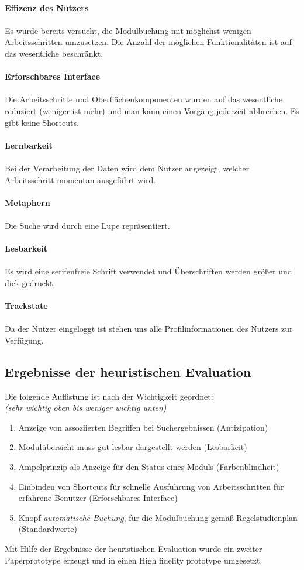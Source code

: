 \documentclass{article}
\begin{document}
\\
\textbf{Effizenz des Nutzers}\\
\\
Es wurde bereits versucht, die Modulbuchung mit möglichst wenigen Arbeitsschritten umzusetzen. Die Anzahl der möglichen Funktionalitäten ist auf das wesentliche beschränkt.\\
\\
\textbf{Erforschbares Interface}\\
\\
Die Arbeitsschritte und Oberflächenkomponenten wurden auf das wesentliche reduziert (weniger ist mehr) und man kann einen Vorgang jederzeit abbrechen. Es gibt keine Shortcuts.\\
\\
\textbf{Lernbarkeit}\\
\\
Bei der Verarbeitung der Daten wird dem Nutzer angezeigt, welcher Arbeitsschritt momentan ausgeführt wird.\\
\\
\textbf{Metaphern}\\
\\
Die Suche wird durch eine Lupe repräsentiert.\\
\\
\textbf{Lesbarkeit}\\
\\
Es wird eine serifenfreie Schrift verwendet und Überschriften werden größer und dick gedruckt.\\
\\
\textbf{Trackstate}\\
\\
Da der Nutzer eingeloggt ist stehen uns alle Profilinformationen des Nutzers zur Verfügung.\\
\newpage

\subsection{Ergebnisse der heuristischen Evaluation}

Die folgende Auflistung ist nach der Wichtigkeit geordnet:\\
\textit{(sehr wichtig oben bis weniger wichtig unten)}
\begin{enumerate}
\item Anzeige von assoziierten Begriffen bei Suchergebnissen (Antizipation)
\item Modulübersicht muss gut lesbar dargestellt werden (Lesbarkeit)
\item Ampelprinzip als Anzeige für den Status eines Moduls (Farbenblindheit)
\item Einbinden von Shortcuts für schnelle Ausführung von Arbeitsschritten für erfahrene Benutzer (Erforschbares Interface)
\item Knopf \textit{automatische Buchung}, für die Modulbuchung gemäß Regelstudienplan (Standardwerte) 
\end{enumerate}
Mit Hilfe der Ergebnisse der heuristischen Evaluation wurde ein zweiter Paperprototype erzeugt und in einen High fidelity prototype umgesetzt.
\end{document}
